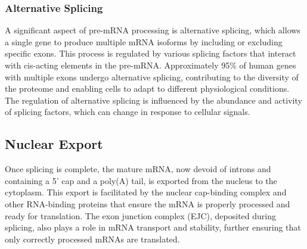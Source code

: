\subsubsection{Alternative Splicing}
A significant aspect of pre-mRNA processing is alternative splicing, which
allows a single gene to produce multiple mRNA isoforms by including or excluding
specific exons. This process is regulated by various splicing factors that
interact with cis-acting elements in the
pre-mRNA\supercite{le_alternative_2015,murphy_therapeutic_2022}. Approximately
95\% of human genes with multiple exons undergo alternative splicing,
contributing to the diversity of the proteome and enabling cells to adapt to
different physiological conditions\supercite{le_alternative_2015}. The
regulation of alternative splicing is influenced by the abundance and activity
of splicing factors, which can change in response to cellular
signals\supercite{wang_mechanism_2015}.

\subsection{Nuclear Export}
Once splicing is complete, the mature mRNA, now devoid of introns and containing
a 5' cap and a poly(A) tail, is exported from the nucleus to the cytoplasm. This
export is facilitated by the nuclear cap-binding complex and other RNA-binding
proteins that ensure the mRNA is properly processed and ready for
translation\supercite{soucek_evolutionarily_2016}. The exon junction complex
(EJC), deposited during splicing, also plays a role in mRNA transport and
stability, further ensuring that only correctly processed mRNAs are
translated\supercite{hir_exon_2016}.
